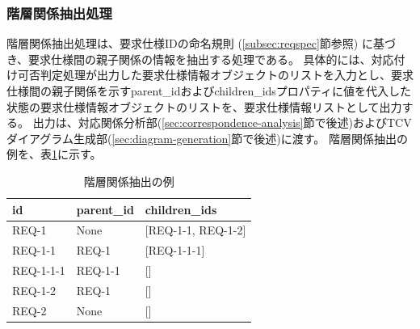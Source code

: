 \subsubsection{階層関係抽出処理}\label{subsubsec:req_hierarchy}
階層関係抽出処理は、要求仕様IDの命名規則 (\ref{subsec:reqspec}節参照) に基づき、要求仕様間の親子関係の情報を抽出する処理である。
具体的には、対応付け可否判定処理が出力した要求仕様情報オブジェクトのリストを入力とし、要求仕様間の親子関係を示すparent\_idおよびchildren\_idsプロパティに値を代入した状態の要求仕様情報オブジェクトのリストを、要求仕様情報リストとして出力する。
出力は、対応関係分析部(\ref{sec:correspondence-analysis}節で後述)およびTCVダイアグラム生成部(\ref{sec:diagram-generation}節で後述)に渡す。
階層関係抽出の例を、表\ref{tb:hierarchy_example}に示す。

\begin{table}[tp]
    \caption{階層関係抽出の例}
    \label{tb:hierarchy_example}
    \centering
    \small
    \begin{tabular}{|l|l|l|}
    \hline
    \textbf{id} & \textbf{parent\_id} & \textbf{children\_ids} \\
    \hline
    REQ-1 & None & [REQ-1-1, REQ-1-2] \\
    \hline
    REQ-1-1 & REQ-1 & [REQ-1-1-1] \\
    \hline
    REQ-1-1-1 & REQ-1-1 & [] \\
    \hline
    REQ-1-2 & REQ-1 & [] \\
    \hline
    REQ-2 & None & [] \\
    \hline
    \end{tabular}
\end{table}


